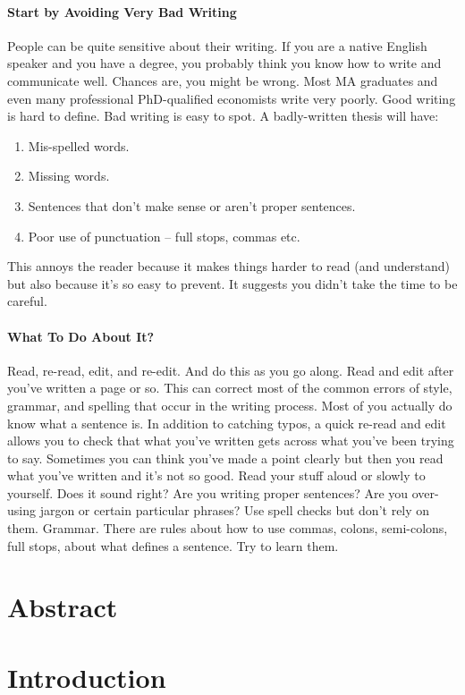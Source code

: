 \paragraph{Start by Avoiding Very Bad Writing}
People can be quite sensitive about their writing.
If you are a native English speaker and you have a degree, you probably think you know how to write and communicate well.
Chances are, you might be wrong.
Most MA graduates and even many professional PhD-qualified economists write very poorly.
Good writing is hard to define. Bad writing is easy to spot.
A badly-written thesis will have:
\begin{enumerate}
	\item Mis-spelled words.
	\item Missing words.
	\item Sentences that don’t make sense or aren’t proper sentences.
	\item Poor use of punctuation – full stops, commas etc.
\end{enumerate}
This annoys the reader because it makes things harder to read (and understand) but also because it’s so easy to prevent.
It suggests you didn’t take the time to be careful.

\paragraph{What To Do About It?}
Read, re-read, edit, and re-edit.
And do this as you go along.
Read and edit after you’ve written a page or so.
This can correct most of the common errors of style, grammar, and spelling that occur in the writing process.
Most of you actually do know what a sentence is.
In addition to catching typos, a quick re-read and edit allows you to check that what you’ve written gets across what you’ve been trying to say.
Sometimes you can think you’ve made a point clearly but then you read what you’ve written and it’s not so good.
Read your stuff aloud or slowly to yourself.
Does it sound right? Are you writing proper sentences? Are you over-using jargon or certain particular phrases?
Use spell checks but don’t rely on them.
Grammar. There are rules about how to use commas, colons, semi-colons, full stops, about what defines a sentence. Try to learn them.

\section{Abstract}


\section{Introduction}


